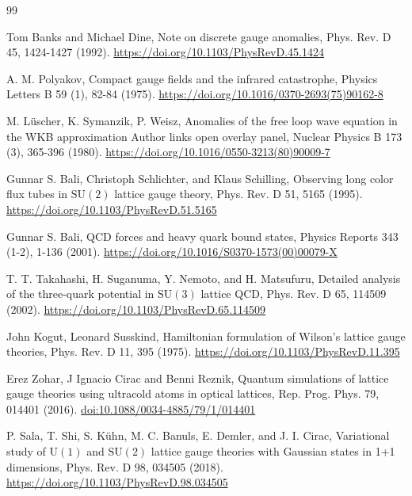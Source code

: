 \documentclass[12pt,a4paper]{article}
\begin{document}
\begin{thebibliography}{99}
	
	Tom Banks and Michael Dine,
	Note on discrete gauge anomalies,
	Phys. Rev. D 45, 1424-1427 (1992).
	\url{https://doi.org/10.1103/PhysRevD.45.1424}
	
	
	A. M. Polyakov,
	Compact gauge fields and the infrared catastrophe,
	Physics Letters B 59 (1), 82-84 (1975).
	\url{https://doi.org/10.1016/0370-2693(75)90162-8}
	
	
	M. L\"{u}scher, K. Symanzik, P. Weisz,
	Anomalies of the free loop wave equation in the WKB approximation Author links open overlay panel,
	Nuclear Physics B 173 (3), 365-396 (1980).
	\url{https://doi.org/10.1016/0550-3213(80)90009-7}
	
		
	
	Gunnar S. Bali, Christoph Schlichter, and Klaus Schilling,
	Observing long color flux tubes in $\mathrm{SU}(2)$ lattice gauge theory,
	Phys. Rev. D 51, 5165 (1995).
	\url{https://doi.org/10.1103/PhysRevD.51.5165}
	
	
	Gunnar S. Bali,
	QCD forces and heavy quark bound states,
	Physics Reports 343 (1-2), 1-136 (2001).
	\url{https://doi.org/10.1016/S0370-1573(00)00079-X} 
	
	
	T. T. Takahashi, H. Suganuma, Y. Nemoto, and H. Matsufuru,
	Detailed analysis of the three-quark potential in $\mathrm{SU}(3)$ lattice QCD,
	Phys. Rev. D 65, 114509 (2002).
	\url{https://doi.org/10.1103/PhysRevD.65.114509}
	
	
	
	John Kogut, Leonard Susskind,
	Hamiltonian formulation of Wilson's lattice gauge theories,
	Phys. Rev. D 11, 395 (1975).
	\url{https://doi.org/10.1103/PhysRevD.11.395}
	
	
	Erez Zohar, J Ignacio Cirac and Benni Reznik,
	Quantum simulations of lattice gauge theories using ultracold atoms in optical lattices,
	Rep. Prog. Phys. 79, 014401 (2016).	
	\href{https://doi.org/10.1088/0034-4885/79/1/014401}{doi:10.1088/0034-4885/79/1/014401} 
	
	P. Sala, T. Shi, S. K\"{u}hn, M. C. Banuls, E. Demler, and J. I. Cirac,
	Variational study of $\mathrm{U}(1)$ and $\mathrm{SU}(2)$ lattice gauge theories with Gaussian states in 1+1 dimensions,
	Phys. Rev. D 98, 034505 (2018).
	\url{https://doi.org/10.1103/PhysRevD.98.034505}
	

\end{thebibliography}
\end{document}
